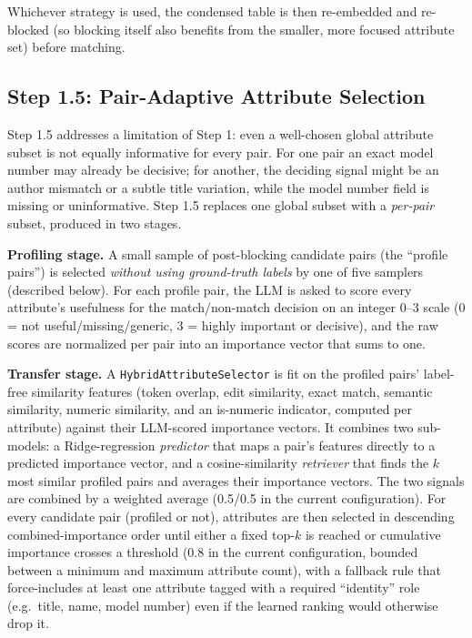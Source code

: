\documentclass[11pt]{article}
\begin{document}
Whichever strategy is used, the condensed table is then re-embedded and re-blocked
(so blocking itself also benefits from the smaller, more focused attribute set)
before matching.

\subsection{Step 1.5: Pair-Adaptive Attribute Selection}
\label{sec:step15}

Step 1.5 addresses a limitation of Step 1: even a well-chosen global attribute
subset is not equally informative for every pair. For one pair an exact model
number may already be decisive; for another, the deciding signal might be an author
mismatch or a subtle title variation, while the model number field is missing or
uninformative. Step 1.5 replaces one global subset with a \emph{per-pair} subset,
produced in two stages.

\textbf{Profiling stage.} A small sample of post-blocking candidate pairs (the
``profile pairs'') is selected \emph{without using ground-truth labels} by one of
five samplers (described below). For each profile pair, the LLM is asked to score
every attribute's usefulness for the match/non-match decision on an integer 0--3
scale (0 = not useful/missing/generic, 3 = highly important or decisive), and the
raw scores are normalized per pair into an importance vector that sums to one.

\textbf{Transfer stage.} A \texttt{HybridAttributeSelector} is fit on the profiled
pairs' label-free similarity features (token overlap, edit similarity, exact match,
semantic similarity, numeric similarity, and an is-numeric indicator, computed per
attribute) against their LLM-scored importance vectors. It combines two
sub-models: a Ridge-regression \emph{predictor} that maps a pair's features directly
to a predicted importance vector, and a cosine-similarity \emph{retriever} that finds
the $k$ most similar profiled pairs and averages their importance vectors. The two
signals are combined by a weighted average (0.5/0.5 in the current configuration).
For every candidate pair (profiled or not), attributes are then selected in
descending combined-importance order until either a fixed top-$k$ is reached or
cumulative importance crosses a threshold (0.8 in the current configuration,
bounded between a minimum and maximum attribute count), with a fallback rule that
force-includes at least one attribute tagged with a required ``identity'' role
(e.g.\ title, name, model number) even if the learned ranking would otherwise drop
it.
\end{document}

